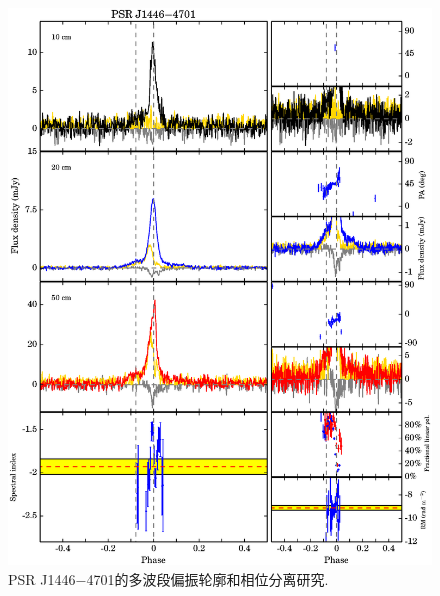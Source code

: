 \begin{figure}
\begin{center}
\includegraphics[width=6 in]{1446.ps}
\caption{PSR J1446$-$4701的多波段偏振轮廓和相位分离研究.}
\label{1446}
\end{center}
\end{figure}

